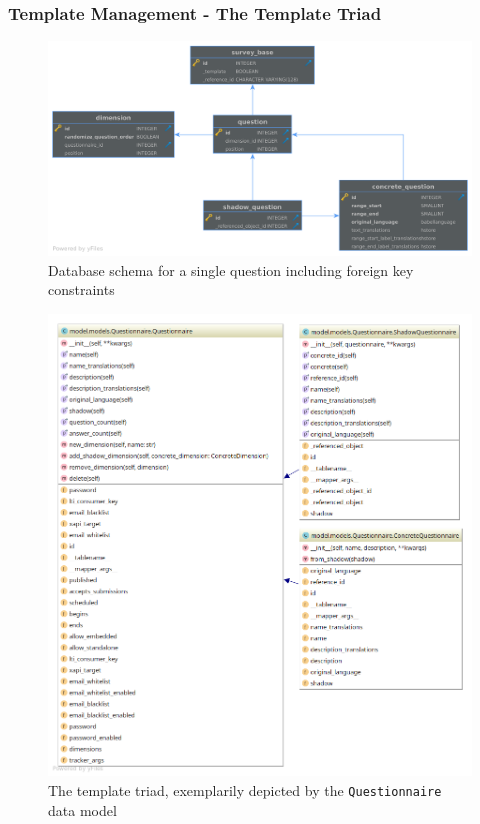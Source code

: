 \documentclass[a4paper,11pt]{article}
\def\inline{\lstinline[basicstyle=\ttfamily,keywordstyle={}]}
\begin{document}
            \subsubsection{Template Management - The Template Triad}
                \begin{figure}
                    \centering
                    \includegraphics[width=\textwidth]{schema-shadows}
                    \caption{Database schema for a single question including foreign key constraints}
                    \label{fig:schema-shadows}
                \end{figure}
                \begin{figure}
                    \centering
                    \includegraphics[width=.9\textwidth]{questionnaire-dia}
                    \caption{The template triad, exemplarily depicted by the \inline{Questionnaire} data model}
                    \label{fig:questionnaire-dia}
                \end{figure}
\end{document}
